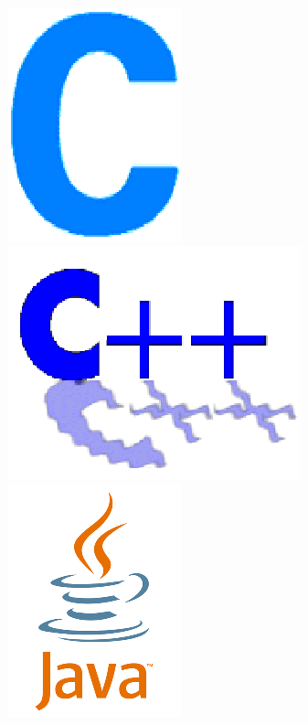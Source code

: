 \documentclass[12pt]{beamer}
\begin{document}
\begin{frame}
{\begin{block}{}
\begin{figure}
  \end{figure}
  \begin{figure}
   \begin{center}
    \includegraphics[scale=0.15]{img/Logoc.png} \textbf{}
    \includegraphics[scale=0.15]{img/Logocpp.png} \textbf{}
    \includegraphics[scale=0.15]{img/Logojava.png} \textbf{}
   \end{center}
  
  \end{figure}
\end{block}
}
\end{frame}
\end{document}
